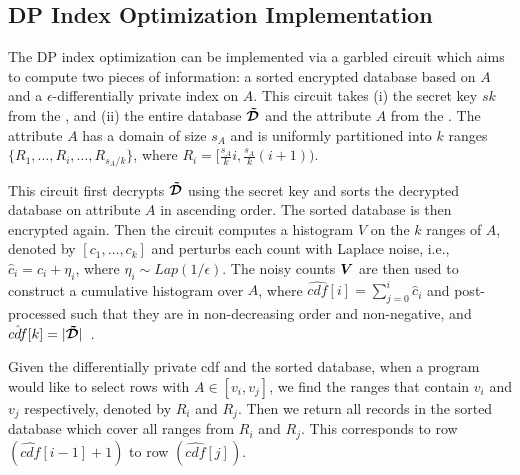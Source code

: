 \subsection{DP Index Optimization Implementation}\label{app:index-imp}

The DP index optimization can be implemented via a garbled circuit which aims to compute two pieces of information: a sorted encrypted database based on $A$ and a $\epsilon$-differentially private index on $A$. This circuit takes (i) the secret key $sk$ from the \CPS, and (ii) the entire database $\boldsymbol{\tilde{\mathcal{D}}}$ and the attribute $A$ from the \AS. The attribute $A$ has a domain of size $s_A$ and is uniformly partitioned into $k$ ranges $\{R_1,\ldots, R_i, \ldots, R_{s_A/k}\}$, where $R_i = [\frac{s_A}{k}i, \frac{s_A}{k}(i+1))$.

This circuit first decrypts $\boldsymbol{\tilde{\mathcal{D}}}$ using the secret key and sorts the decrypted database on attribute $A$ in ascending order. The sorted database is then encrypted again. Then the circuit computes a histogram $V$ on the $k$ ranges of $A$, denoted by $[c_1,\ldots,c_k]$  and perturbs each count with Laplace noise, i.e., $\hat{c}_i = c_i + \eta_i$, where $\eta_i\sim Lap(1/\epsilon)$. The noisy counts $\boldsymbol{V}$ are then used to construct a cumulative histogram over $A$, where $\hat{cdf}[i] = \sum_{j=0}^i \hat{c}_i$ and post-processed such that they are in non-decreasing order and non-negative, and $\hat{cdf}[k] = |\boldsymbol{\tilde{\mathcal{D}}}|$~\cite{cdf}.

Given the differentially private cdf and the sorted database, when a program would like to select rows with $A\in [v_i, v_j]$, we find the ranges that contain $v_i$ and $v_j$ respectively, denoted by $R_i$ and $R_j$. Then we return all records in the sorted database which cover all ranges from $R_i$ and $R_j$. This corresponds to row $(\hat{cdf}[i-1]+1)$ to row $(\hat{cdf}[j])$.






